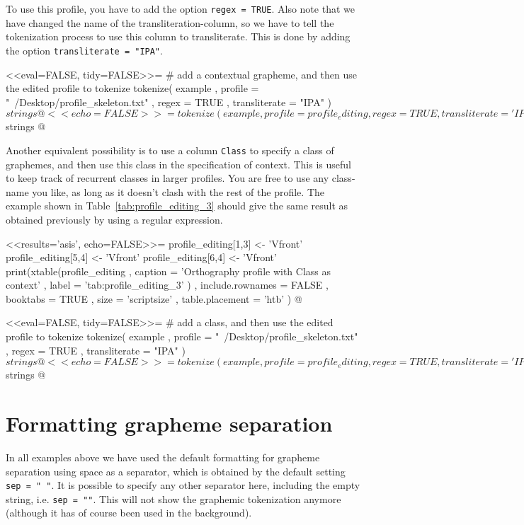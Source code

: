 To use this profile, you have to add the option \texttt{regex = TRUE}. Also note
that we have changed the name of the transliteration-column, so we have to tell
the tokenization process to use this column to transliterate. This is done by
adding the option \texttt{transliterate = "IPA"}.

<<eval=FALSE, tidy=FALSE>>=
# add a contextual grapheme, and then use the edited profile to tokenize
tokenize( example
         , profile = "~/Desktop/profile_skeleton.txt"
         , regex = TRUE
         , transliterate = "IPA"
        )$strings
@

<<echo=FALSE>>=
tokenize(example
  , profile = profile_editing
  , regex = TRUE
  , transliterate = 'IPA'
  )$strings
@

Another equivalent possibility is to use a column \texttt{Class} to specify a
class of graphemes, and then use this class in the specification of context.
This is useful to keep track of recurrent classes in larger profiles. You are
free to use any class-name you like, as long as it doesn't clash with the rest
of the profile. The example shown in Table~\ref{tab:profile_editing_3} should 
give the same result as obtained previously by using a regular expression.

<<results='asis', echo=FALSE>>=
profile_editing[1,3] <- 'Vfront'
profile_editing[5,4] <- 'Vfront'
profile_editing[6,4] <- 'Vfront'
print(xtable(profile_editing
        , caption = 'Orthography profile with Class as context'
        , label = 'tab:profile_editing_3'
        )
  , include.rownames = FALSE
  , booktabs = TRUE
  , size = 'scriptsize'
  , table.placement = 'htb'
  )
@

<<eval=FALSE, tidy=FALSE>>=
# add a class, and then use the edited profile to tokenize
tokenize( example
         , profile = "~/Desktop/profile_skeleton.txt"
         , regex = TRUE
         , transliterate = "IPA"
        )$strings
@

<<echo=FALSE>>=
tokenize(example
  , profile = profile_editing
  , regex = TRUE
  , transliterate = 'IPA'
  )$strings
@

\section{Formatting grapheme separation}
\label{formattingseparation}

In all examples above we have used the default formatting for grapheme
separation using space as a separator, which is obtained by the default setting
\texttt{sep~=~"~"}. It is possible to specify any other separator here,
including the empty string, i.e. \texttt{sep = ""}. This will not show the
graphemic tokenization anymore (although it has of course been used in the
background).

